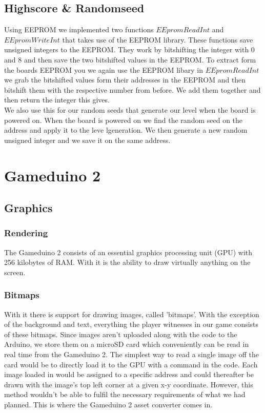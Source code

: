 \subsection*{Highscore \& Randomseed}
Using EEPROM we implemented two functions $EEpromReadInt$ and $EEpromWriteInt$ that takes use of the EEPROM library. These functions save unsigned integers to the EEPROM. They work by bitshifting the integer with 0 and 8 and then save the two bitshifted values in the EEPROM. To extract form the boards EEPROM you we again use the EEPROM libary in $EEpromReadInt$ we grab the bitshifted values form their addresses in the EEPROM and then bitshift them with the respective number from before. We add them together and then return the integer this gives.\\ We also use this for our random seeds that generate our level when the board is powered on. When the board is powered on we find the random seed on the address and apply it to the leve lgeneration. We then generate a new random unsigned integer and we save it on the same address. 



\section{Gameduino 2}
\subsection*{Graphics}
\subsubsection*{Rendering}
The Gameduino 2 consists of an essential graphics processing unit (GPU) with 256 kilobytes of RAM. With it is the ability to draw virtually anything on the screen. 

\subsubsection*{Bitmaps}
With it there is support for drawing images, called 'bitmaps'. With the exception of the background and text, everything the player witnesses in our game consists of these bitmaps. Since images aren’t uploaded along with the code to the Arduino, we store them on a microSD card which conveniently can be read in real time from the Gameduino 2. The simplest way to read a single image off the card would be to directly load it to the GPU with a command in the code. Each image loaded in would be assigned to a specific address and could thereafter be drawn with the image’s top left corner at a given x-y coordinate. However, this method wouldn’t be able to fulfil the necessary requirements of what we had planned. This is where the Gameduino 2 asset converter comes in.

